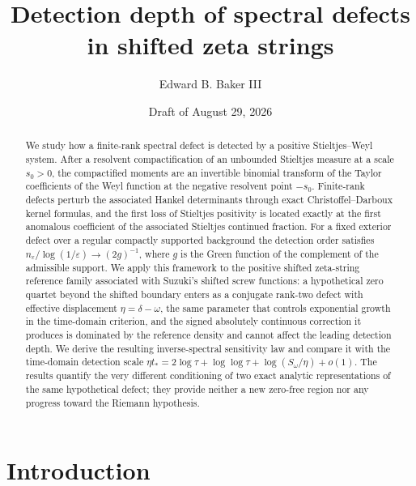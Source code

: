 \documentclass[11pt]{amsart}
\theoremstyle{definition}
\theoremstyle{remark}
\newcommand{\eps}{\varepsilon}
\begin{document}
\title[Detection depth of spectral defects in shifted zeta strings]
{Detection depth of spectral defects\\ in shifted zeta strings}

\author{Edward B. Baker III}
\date{Draft of August 29, 2026}

\begin{abstract}
We study how a finite-rank spectral defect is detected by a positive
Stieltjes--Weyl system. After a resolvent compactification of an unbounded
Stieltjes measure at a scale $s_0>0$, the compactified moments are an
invertible binomial transform of the Taylor coefficients of the Weyl function
at the negative resolvent point $-s_0$. Finite-rank defects perturb the
associated Hankel determinants through exact Christoffel--Darboux kernel
formulas, and the first loss of Stieltjes positivity is located exactly at the
first anomalous coefficient of the associated Stieltjes continued fraction.
For a fixed exterior defect over a regular compactly supported background the
detection order satisfies $n_\eps/\log(1/\eps)\to (2g)^{-1}$, where $g$ is the
Green function of the complement of the admissible support. We apply this
framework to the positive shifted zeta-string reference family associated with
Suzuki's shifted screw functions: a hypothetical zero quartet beyond the
shifted boundary enters as a conjugate rank-two defect with effective
displacement $\eta=\delta-\omega$, the same parameter that controls
exponential growth in the time-domain criterion, and the signed
absolutely continuous correction it produces is dominated by the reference
density and cannot affect the leading detection depth. We derive the
resulting inverse-spectral sensitivity law and compare it with the
time-domain detection scale
$\eta t_*=2\log\tau+\log\log\tau+\log(S_\omega/\eta)+o(1)$.
The results quantify the very different conditioning of two exact analytic
representations of the same hypothetical defect; they provide neither a new
zero-free region nor any progress toward the Riemann hypothesis.
\end{abstract}

\maketitle
\tableofcontents

\section{Introduction}\label{sec:intro}
\end{document}
